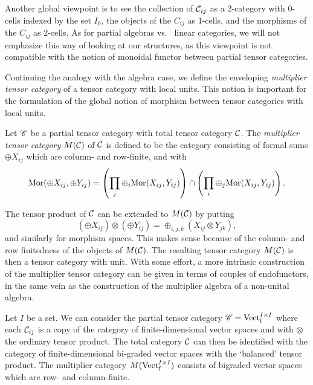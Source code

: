 \begin{Rem} Another global viewpoint is to see the collection of $\mathcal{C}_{ij}$ as a 2-category with 0-cells indexed by the set $I_0$, the objects of the $C_{ij}$ as 1-cells, and  the morphisms of the $C_{ij}$ as 2-cells. As for partial algebras vs.~ linear categories, we will not emphasize this way of looking at our structures, as this viewpoint is not compatible with the notion of monoidal functor between partial tensor categories.
\end{Rem} 

Continuing the analogy with the algebra case, we define the enveloping \emph{multiplier tensor category} of a tensor category with local units. This notion is important for the formulation of the global notion of morphism between tensor categories with local units. 

\begin{Def} Let $\mathscr{C}$ be a partial tensor category with total tensor category $\mathcal{C}$. The \emph{multiplier tensor category} $M(\mathcal{C})$ of $\mathcal{C}$ is defined to be the category consisting of formal sums $\oplus X_{ij}$ which are column- and row-finite, and with \[\mathrm{Mor}(\oplus X_{ij},\oplus Y_{ij}) = \left(\prod_j\oplus_i  \mathrm{Mor}(X_{ij},Y_{ij}) \right) \cap \left(\prod_i\oplus_j \mathrm{Mor}(X_{ij},Y_{ij})\right).\]
\end{Def}

The tensor product of $\mathcal{C}$ can be extended to $M(\mathcal{C})$ by putting \[\left(\oplus X_{ij}\right)\otimes \left(\oplus Y_{ij}\right) = \oplus_{i,j,k} \left(X_{ij}\otimes Y_{jk}\right),\] and similarly for morphism spaces. This makes sense because of the column- and row finitedness of the objects of $M(\mathcal{C})$. The resulting tensor category $M(\mathcal{C})$ is then a tensor category with unit. With some effort, a more intrinsic construction of the multiplier tensor category can be given in terms of couples of endofunctors, in the same vein as the construction of the multiplier algebra of a non-unital algebra. 

\begin{Exa} Let $I$ be a set. We can consider the partial tensor category $\mathscr{C} = \mathrm{Vect}^{I\times I}_{\operatorname{\mathrm{f}}}$ where each $\mathcal{C}_{ij}$ is a copy of the category of finite-dimensional vector spaces and with $\otimes$ the ordinary tensor product. The total category $\mathcal{C}$ can then be identified with the category of finite-dimensional bi-graded vector spaces with the `balanced' tensor product. The multiplier category $M(\mathrm{Vect}^{I\times I}_{\operatorname{\mathrm{f}}})$ consists of bigraded vector spaces which are row- and column-finite.
\end{Exa}

